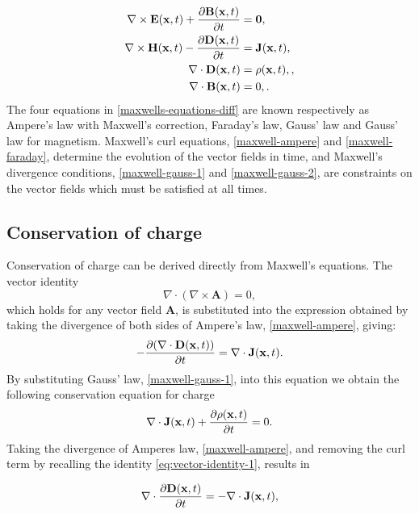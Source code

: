 \begin{subequations}
\label{maxwells-equations-diff}
\begin{align}
    \nabla \times \mathbf{E}(\mathbf{x},t) + \frac{\partial \mathbf{B}(\mathbf{x}, t)}{\partial t}&= \mathbf{0}, \label{maxwell-faraday} \\
    \nabla \times \mathbf{H}(\mathbf{x},t) - \frac{\partial \mathbf{D}(\mathbf{x}, t)}{\partial t}&= \mathbf{J}(\mathbf{x},t), \label{maxwell-ampere} \\
    \nabla \cdot \mathbf{D} (\mathbf{x},t) &= \rho(\mathbf{x},t), \label{maxwell-gauss-1}, \\
    \nabla \cdot \mathbf{B} (\mathbf{x},t) &= 0, \label{maxwell-gauss-2} .
\end{align}
\end{subequations}
The four equations in \eqref{maxwells-equations-diff} are known respectively as Ampere's law with Maxwell's correction, Faraday's law, Gauss' law and Gauss' law for magnetism. Maxwell's curl equations, \eqref{maxwell-ampere} and \eqref{maxwell-faraday}, determine the evolution of the vector fields in time, and Maxwell's divergence conditions, \eqref{maxwell-gauss-1} and \eqref{maxwell-gauss-2}, are constraints on the vector fields which must be satisfied at all times.

\subsection{Conservation of charge}

Conservation of charge can be derived directly from Maxwell's equations. The vector identity
\begin{equation}
\label{eq:vector-identity-1}
\nabla \cdot ( \nabla \times \mathbf{A} ) = 0,
\end{equation}
which holds for any vector field $\mathbf{A}$, is substituted into the expression obtained by taking the divergence of both sides of Ampere's law, \eqref{maxwell-ampere}, giving:
$$
- \frac{\partial ( \nabla \cdot \mathbf{D}(\mathbf{x},t) ) }{\partial t} = \nabla \cdot \mathbf{J}(\mathbf{x},t) .
$$
By substituting Gauss' law, \eqref{maxwell-gauss-1}, into this equation we obtain the following conservation equation for charge
\begin{equation}
\label{eq:maxwell-charge-conservation-2}
\nabla \cdot \mathbf{J}(\mathbf{x},t) + \frac{\partial \rho (\mathbf{x},t) }{\partial t} = 0 .
\end{equation}
Taking the divergence of Amperes law, \eqref{maxwell-ampere}, and removing the curl term by recalling the identity \eqref{eq:vector-identity-1}, results in

$$
\nabla \cdot \frac{\partial  \mathbf{D}(\mathbf{x}, t)}{\partial t} = - \nabla \cdot \mathbf{J}(\mathbf{x},t),
$$


